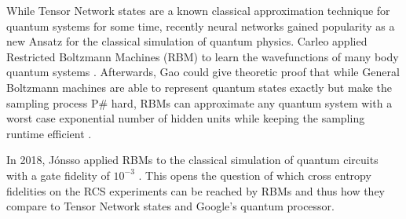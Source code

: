 While Tensor Network states are a known classical approximation technique for quantum systems for 
some time, recently neural networks gained popularity as a new Ansatz for the classical simulation
of quantum physics. Carleo applied Restricted Boltzmann Machines (RBM) to learn the wavefunctions of many body 
quantum systems \cite{Carleo_2017}. Afterwards, Gao could give theoretic proof that while General 
Boltzmann machines are able to represent quantum states exactly but make the sampling process P\#
hard, RBMs can approximate any quantum system with a worst case exponential number of hidden units while keeping the 
sampling runtime efficient \cite{Gao_2017}.

In 2018, Jónsso applied RBMs to the classical simulation of 
quantum circuits with a gate fidelity of $10^{-3}$ \cite{jnsson2018neuralnetwork}. This opens the question of which 
cross entropy fidelities on the RCS experiments can be reached by RBMs and thus how they compare to 
Tensor Network states and Google's quantum processor.